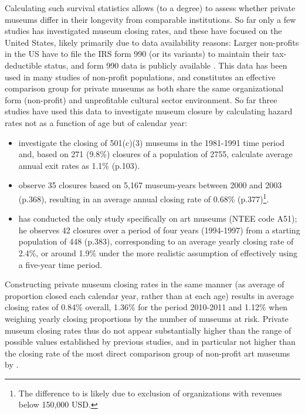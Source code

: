 \documentclass[12pt]{article}
\begin{document}
Calculating such survival statistics allows (to a degree) to assess whether private museums differ in their longevity from comparable institutions.
So far only a few studies has investigated museum closing rates, and these have focused on the United States, likely primarily due to data availability reasons: 
Larger non-profits in the US have to file the IRS form 990 (or its variants) to maintain their tax-deductible status, and form 990 data is publicly available \parencite{Lecy_2023_core}.
This data has been used in many studies of non-profit populations, and constitutes an effective comparison group for private museums as both share the same organizational form (non-profit) and unprofitable cultural sector environment.
So far three studies have used this data to investigate museum closure by calculating hazard rates not as a function of age but of calendar year:
\begin{itemize}
\item \textcite{Bowen_etal_1994_charitable} investigate the closing of 501(c)(3) museums in the 1981-1991 time period and, based on 271 (9.8\%) closures of a population of 2755, calculate average annual exit rates as 1.1\% (p.103).
\item \textcite{Gordon_etal_2013_insolvency} observe 35 closures based on 5,167 museum-years between 2000 and 2003 (p.368), resulting in an average annual closing rate of 0.68\% (p.377)\footnote{The difference to \cite{Bowen_etal_1994_charitable} is likely due to exclusion of organizations with revenues below 150,000 USD.}.
\item \textcite{Hager_2001_vulnerability} has conducted the only study specifically on art museums (NTEE code A51); he observes 42 closures over a period of four years (1994-1997) from a starting population of 448 (p.383), corresponding to an average yearly closing rate of 2.4\%, or around 1.9\% under the more realistic assumption of effectively using a five-year time period.
\end{itemize}

Constructing private museum closing rates in the same manner (as average of proportion closed each calendar year, rather than at each age) results in average closing rates of 0.84\% overall, 1.36\% for the period 2010-2011 and 1.12\% when weighing yearly closing proportions by the number of museums at risk.
Private museum closing rates thus do not appear substantially higher than the range of possible values established by previous studies, and in particular not higher than the closing rate of the most direct comparison group of non-profit art museums by \textcite{Hager_2001_vulnerability}. 
\end{document}

